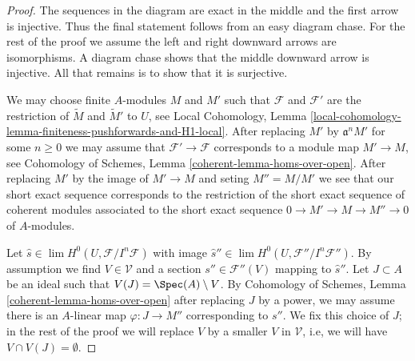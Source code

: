 \begin{proof}
The sequences in the diagram are exact in the middle and the first
arrow is injective. Thus the final statement follows from an easy
diagram chase. For the rest of the proof we assume the left and
right downward arrows are isomorphisms. A diagram chase shows
that the middle downward arrow is injective. All that remains
is to show that it is surjective.

\medskip\noindent
We may choose finite $A$-modules $M$ and $M'$ such that $\mathcal{F}$
and $\mathcal{F}'$ are the restriction
of $\widetilde{M}$ and $\widetilde{M}'$ to $U$, see Local Cohomology, Lemma
\ref{local-cohomology-lemma-finiteness-pushforwards-and-H1-local}.
After replacing $M'$ by $\mathfrak a^n M'$ for some $n \geq 0$
we may assume that $\mathcal{F}' \to \mathcal{F}$
corresponds to a module map $M' \to M$, see
Cohomology of Schemes, Lemma \ref{coherent-lemma-homs-over-open}.
After replacing $M'$ by the image of $M' \to M$
and seting $M'' = M/M'$ we see that our short exact sequence
corresponds to the restriction of the short exact sequence of
coherent modules associated to the short exact sequence
$0 \to M' \to M \to M'' \to 0$ of $A$-modules.

\medskip\noindent
Let $\hat s \in \lim H^0(U, \mathcal{F}/I^n\mathcal{F})$
with image $\hat s'' \in \lim H^0(U, \mathcal{F}''/I^n\mathcal{F}'')$.
By assumption we find $V \in \mathcal{V}$
and a section $s'' \in \mathcal{F}''(V)$ mapping to $\hat s''$.
Let $J \subset A$ be an ideal such that $V(J) = \Spec(A) \setminus V$.
By Cohomology of Schemes, Lemma \ref{coherent-lemma-homs-over-open}
after replacing $J$ by a power, we may assume
there is an $A$-linear map $\varphi : J \to M''$
corresponding to $s''$. We fix this choice of $J$; in the rest
of the proof we will replace $V$ by a smaller $V$ in $\mathcal{V}$,
i.e, we will have $V \cap V(J) = \emptyset$.


\end{proof}
